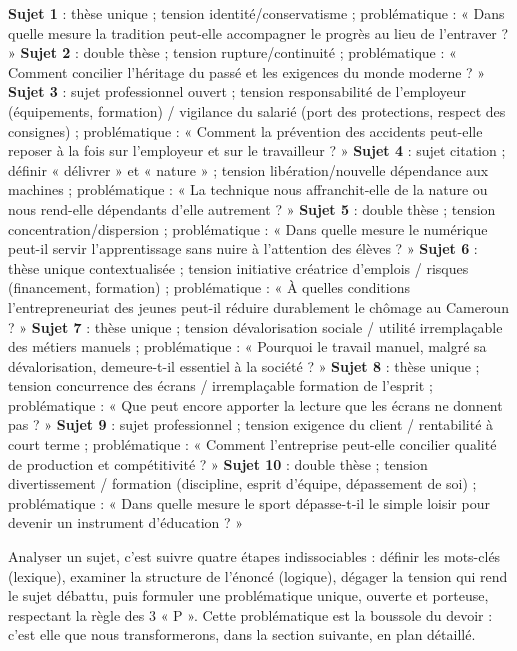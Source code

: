 \documentclass[11pt]{article}
\begin{document}
\begin{corrige}
\textbf{Sujet 1} : thèse unique ; tension identité/conservatisme ; problématique : « Dans quelle mesure la tradition peut-elle accompagner le progrès au lieu de l'entraver ? »
\textbf{Sujet 2} : double thèse ; tension rupture/continuité ; problématique : « Comment concilier l'héritage du passé et les exigences du monde moderne ? »
\textbf{Sujet 3} : sujet professionnel ouvert ; tension responsabilité de l'employeur (équipements, formation) / vigilance du salarié (port des protections, respect des consignes) ; problématique : « Comment la prévention des accidents peut-elle reposer à la fois sur l'employeur et sur le travailleur ? »
\textbf{Sujet 4} : sujet citation ; définir « délivrer » et « nature » ; tension libération/nouvelle dépendance aux machines ; problématique : « La technique nous affranchit-elle de la nature ou nous rend-elle dépendants d'elle autrement ? »
\textbf{Sujet 5} : double thèse ; tension concentration/dispersion ; problématique : « Dans quelle mesure le numérique peut-il servir l'apprentissage sans nuire à l'attention des élèves ? »
\textbf{Sujet 6} : thèse unique contextualisée ; tension initiative créatrice d'emplois / risques (financement, formation) ; problématique : « À quelles conditions l'entrepreneuriat des jeunes peut-il réduire durablement le chômage au Cameroun ? »
\textbf{Sujet 7} : thèse unique ; tension dévalorisation sociale / utilité irremplaçable des métiers manuels ; problématique : « Pourquoi le travail manuel, malgré sa dévalorisation, demeure-t-il essentiel à la société ? »
\textbf{Sujet 8} : thèse unique ; tension concurrence des écrans / irremplaçable formation de l'esprit ; problématique : « Que peut encore apporter la lecture que les écrans ne donnent pas ? »
\textbf{Sujet 9} : sujet professionnel ; tension exigence du client / rentabilité à court terme ; problématique : « Comment l'entreprise peut-elle concilier qualité de production et compétitivité ? »
\textbf{Sujet 10} : double thèse ; tension divertissement / formation (discipline, esprit d'équipe, dépassement de soi) ; problématique : « Dans quelle mesure le sport dépasse-t-il le simple loisir pour devenir un instrument d'éducation ? »
\end{corrige}

\begin{aretenir}
Analyser un sujet, c'est suivre quatre étapes indissociables : définir les mots-clés (lexique), examiner la structure de l'énoncé (logique), dégager la tension qui rend le sujet débattu, puis formuler une problématique unique, ouverte et porteuse, respectant la règle des 3 « P ». Cette problématique est la boussole du devoir : c'est elle que nous transformerons, dans la section suivante, en plan détaillé.
\end{aretenir}
\end{document}
